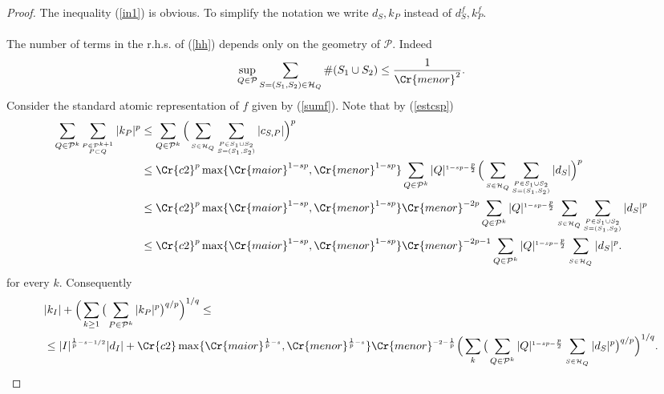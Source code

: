 \documentclass{amsart}
\theoremstyle{definition}
\newcommand{\Crr}[1]{\Cr{#1}}
\begin{document}
 \begin{proof} The inequality (\ref{in1}) is obvious. To simplify the notation we write $d_S, k_P$ instead of $d_S^f, k_P^f$.\ \\ \\
  The  number of terms in the r.h.s. of (\ref{hh}) depends only on the geometry of $\mathcal{P}$. Indeed 
 \begin{equation}\label{numero}  \sup_{Q \in \mathcal{P}} \sum_{S=(S_1,S_2) \in \mathcal{H}_Q} \#(S_1 \cup S_2) \leq \frac{1}{\Crr{menor}^2}.\end{equation} 
  Consider the standard atomic representation of $f$ given by  (\ref{sumf}). Note that  by (\ref{estcsp})
\begin{align*} 
\sum_{Q\in \mathcal{P}^{k}} \sum_{\substack{ _{P \in \mathcal{P}^{k+1}}\\ _{P\subset Q}}} |k_P|^p &\leq   \sum_{Q\in \mathcal{P}^{k}} \Big(\sum_{_{S\in \mathcal{H}_Q}}   \sum_{\substack{_{P\in S_1\cup S_2}\\_{S=(S_1,S_2)}}} |c_{S,P}| \Big)^p  \\
&\leq  \Crr{c2}^p \max\{ \Crr{maior}^{1-sp}, \Crr{menor}^{1-sp}\}  \sum_{Q\in \mathcal{P}^{k}}  |Q|^{_{1-sp -\frac{p}{2}}}   \Big( \sum_{_{S\in \mathcal{H}_Q}}   \sum_{\substack{_{P\in S_1\cup S_2}\\_{S=(S_1,S_2)}}}   |d_S|\Big)^p   \\
&\leq   \Crr{c2}^p  \max\{ \Crr{maior}^{1-sp}, \Crr{menor}^{1-sp}\}\Crr{menor}^{-2p} \sum_{Q\in \mathcal{P}^{k}}  |Q|^{_{1-sp -\frac{p}{2}}}   \sum_{_{S\in \mathcal{H}_Q}}   \sum_{\substack{_{P\in S_1\cup S_2}\\_{S=(S_1,S_2)}}}   |d_S|^p   \\
&\leq   \Crr{c2}^p  \max\{ \Crr{maior}^{1-sp}, \Crr{menor}^{1-sp}\} \Crr{menor}^{-2p-1} \sum_{Q\in \mathcal{P}^{k}}  |Q|^{_{1-sp -\frac{p}{2}}}   \sum_{_{S\in \mathcal{H}_Q}}   |d_S|^p.
\end{align*}
for every $k$. Consequently
\begin{align*} 
& |k_I|+ \Big( \sum_{k\geq 1} \big( \sum_{P \in \mathcal{P}^{k}} |k_P|^p\big)^{q/p}  \Big)^{1/q} \leq \\
&\leq   |I|^{_{\frac{1}{p}-s-1/2}} |d_I|  + \Crr{c2} \max\{ \Crr{maior}^{_{\frac{1}{p}-s}}, \Crr{menor}^{_{\frac{1}{p}-s}}\}\Crr{menor}^{_{-2-\frac{1}{p}}}  \Big( \sum_k  \big(  \sum_{Q\in \mathcal{P}^{k}}  |Q|^{_{1-sp -\frac{p}{2}}}   \sum_{_{S\in \mathcal{H}_Q}}   |d_S|^p\big)^{q/p} \Big)^{1/q}.
\end{align*}

\end{proof}
\end{document}
